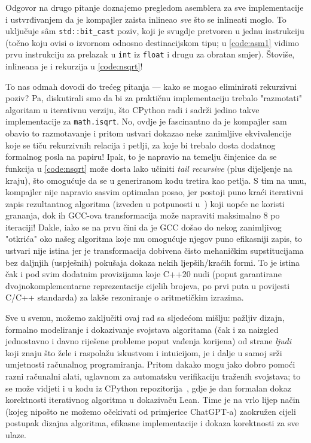 \documentclass[12pt]{scrartcl}
\begin{document}
Odgovor na drugo pitanje doznajemo pregledom asemblera za sve implementacije i ustvrđivanjem da je kompajler zaista inlineao \emph{sve} što se
inlineati moglo. To uključuje s\^am \verb|std::bit_cast| poziv, koji je svugdje pretvoren u jednu instrukciju (točno koju ovisi o izvornom odnosno
destinacijskom tipu; u \autoref{code:asm1} vidimo prvu instrukciju za prelazak u \verb|int| iz \verb|float| i drugu za obratan smjer). Štoviše,
inlineana je i rekurzija u \autoref{code:nsqrt}!

To nas odmah dovodi do trećeg pitanja --- kako se mogao eliminirati rekurzivni poziv? Pa, diskutirali smo da bi za praktičnu implementaciju trebalo
"razmotati" algoritam u iterativnu verziju, što CPython radi i sadrži jedino takve implementacije za \verb|math.isqrt|. No, ovdje je fascinantno da je
kompajler sam obavio to razmotavanje i pritom ustvari dokazao neke zanimljive ekvivalencije koje se tiču rekurzivnih relacija i petlji, za koje bi
trebalo dosta dodatnog formalnog posla na papiru! Ipak, to je napravio na temelju
činjenice da se funkcija u \autoref{code:nsqrt} može dosta lako učiniti \textsl{tail recursive} (plus dijeljenje na kraju),
što omogućuje da se u generiranom kodu tretira kao petlja.
S tim na umu, kompajler nije napravio sasvim optimalan posao, jer postoji puno kraći iterativni zapis rezultantnog algoritma
(izveden u potpunosti u~\cite{mdickpaper}) koji uopće ne koristi grananja,
dok ih GCC-ova transformacija može napraviti maksimalno $8$ po iteraciji! Dakle, iako se na prvu čini da je GCC došao
do nekog zanimljivog "otkrića" oko našeg
algoritma koje mu omogućuje njegov puno efikasniji zapis, to ustvari nije istina jer je transformacija dobivena čisto mehaničkim supstitucijama bez daljnjih
(uspješnih) pokušaja dokaza nekih ljepših/kraćih formi. To je istina čak i pod svim dodatnim provizijama koje C++20 nudi (poput garantirane dvojnokomplementarne
reprezentacije cijelih brojeva, po prvi puta u povijesti C/C++ standarda) za lakše rezoniranje o aritmetičkim izrazima.

Sve u svemu, možemo zaključiti ovaj rad sa sljedećom mišlju: pažljiv dizajn, formalno modeliranje i dokazivanje svojstava algoritama
(čak i za naizgled jednostavno i davno riješene probleme poput vađenja korijena)
od strane \emph{ljudi} koji znaju što žele i raspolažu iskustvom i intuicijom, je i dalje u samoj srži umjetnosti računalnog programiranja. Pritom
dakako mogu jako dobro pomoći razni računalni alati, uglavnom za automatsku verifikaciju traženih svojstava; to se
može vidjeti i u kodu iz CPython repozitorija~\cite{Cpythonisqrt}, gdje je dan formalan dokaz korektnosti iterativnog algoritma u dokazivaču Lean.
Time je na vrlo lijep način (kojeg nipošto ne možemo očekivati od primjerice ChatGPT-a)
zaokružen cijeli postupak dizajna algoritma, efikasne implementacije i dokaza korektnosti za sve ulaze.
\pagebreak


\printbibliography
\end{document}
